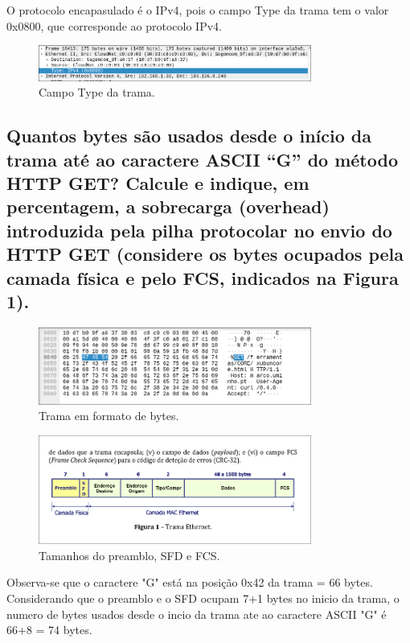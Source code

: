 O protocolo encapasulado é o IPv4, pois o campo Type da trama tem o valor 0x0800, que corresponde ao protocolo IPv4.

\begin{figure}
    \centering
    \includegraphics[width=0.8\textwidth]{type.png}
    \caption{\label{fig:type}Campo Type da trama.}
\end{figure}

\subsection{Quantos bytes são usados desde o início da trama até ao caractere ASCII “G” do
método HTTP GET? Calcule e indique, em percentagem, a sobrecarga (overhead)
introduzida pela pilha protocolar no envio do HTTP GET (considere os bytes
ocupados pela camada física e pelo FCS, indicados na Figura 1).}

\begin{figure}[h]
    \centering
    \includegraphics[width=0.8\textwidth]{byte.png}
    \caption{\label{fig:byte}Trama em formato de bytes.}
\end{figure}

\begin{figure}[h]
    \centering
    \includegraphics[width=0.8\textwidth]{fcs.png}
    \caption{\label{fig:fcs}Tamanhos do preamblo, SFD e FCS.}
\end{figure}

Observa-se que o caractere "G" está na posição 0x42 da trama = 66 bytes. Considerando que o preamblo e o SFD ocupam 7+1 bytes no inicio da trama, o numero de bytes usados desde o incio da trama ate ao caractere ASCII "G" é 66+8 = 74 bytes.

